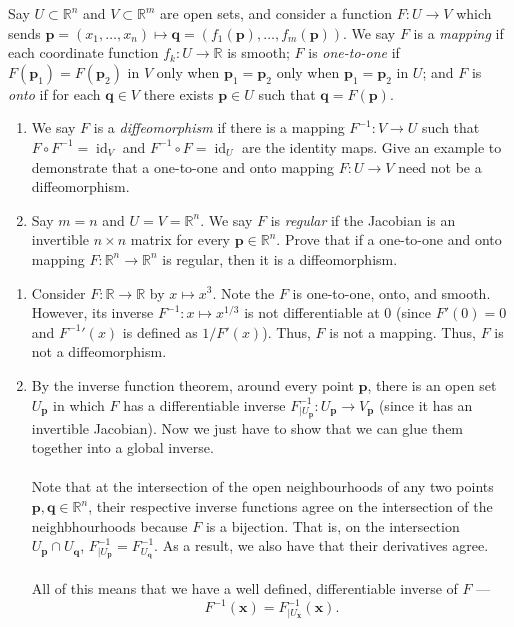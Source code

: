 \documentclass[12 pt, letterpaper]{hmcpset}
\begin{document}
\begin{problem}[Problem 1.]
	Say $U \subset \mathbb{R}^n$ and $V \subset \mathbb{R}^m$ are open sets, and consider a function $F : U \to V$ which sends $\mathbf{p} = (x_1, \dots, x_n) \mapsto \mathbf{q} = (f_1(\mathbf{p}), \dots, f_m(\mathbf{p}))$. We say $F$ is a \textit{mapping} if each coordinate function $f_k : U \to \mathbb{R}$ is smooth; $F$ is \textit{one-to-one} if $F(\mathbf{p}_1) = F(\mathbf{p}_2)$ in $V$ only when $\mathbf{p}_1 = \mathbf{p}_2$ only when $\mathbf{p}_1 = \mathbf{p}_2$ in $U$; and  $F$ is \textit{onto} if for each $\mathbf{q} \in V$ there exists $\mathbf{p} \in U$ such that $\mathbf{q} = F(\mathbf{p})$.
	\begin{enumerate}
		\item We say $F$ is a \textit{diffeomorphism} if there is a mapping $F^{-1} : V \to U$ such that $F \circ F^{-1} = \operatorname{id}_V$ and $F^{-1} \circ F = \operatorname{id}_U$ are the identity maps. Give an example to demonstrate that a one-to-one and onto mapping $F : U \to V$ need not be a diffeomorphism.
		\item Say $m = n$ and $U = V = \mathbb{R}^n$. We say $F$ is \textit{regular} if the Jacobian is an invertible $n \times n$ matrix for every $\mathbf{p} \in \mathbb{R}^n$. Prove that if a one-to-one and onto mapping $F : \mathbb{R}^n \to \mathbb{R}^n$ is regular, then it is a diffeomorphism.
	\end{enumerate}
\end{problem}

\begin{solution}
	\begin{enumerate}
		\item
			Consider $F : \mathbb{R} \to \mathbb{R}$ by $x \mapsto x^3$. Note the $F$ is one-to-one, onto, and smooth. However, its inverse $F^{-1} : x \mapsto x^{1/3}$ is not differentiable at $0$ (since $F'(0) = 0$ and ${F^{-1}}'(x)$ is defined as $1/F'(x)$). Thus, $F$ is not a mapping. Thus, $F$ is not a diffeomorphism.
		\item
			By the inverse function theorem, around every point $\mathbf{p}$, there is an open set $U_{\mathbf{p}}$ in which $F$ has a differentiable inverse $F^{-1}_{|U_{\mathbf{p}}} : U_{\mathbf{p}} \to V_{\mathbf{p}}$ (since it has an invertible Jacobian). Now we just have to show that we can glue them together into a global inverse. \\\\
			Note that at the intersection of the open neighbourhoods of any two points $\mathbf{p}, \mathbf{q} \in \mathbb{R}^n$, their respective inverse functions agree on the intersection of the neighbhourhoods because $F$ is a bijection. That is, on the intersection $U_\mathbf{p} \cap U_\mathbf{q}$, $F^{-1}_{|U_\mathbf{p}} = F^{-1}_{U_\mathbf{q}}$. As a result, we also have that their derivatives agree. \\\\
			All of this means that we have a well defined, differentiable inverse of $F$ ---
			\[
				F^{-1}(\mathbf{x}) = F^{-1}_{|U_\mathbf{x}}(\mathbf{x}).
			\]
	\end{enumerate}
\end{solution}
\end{document}
